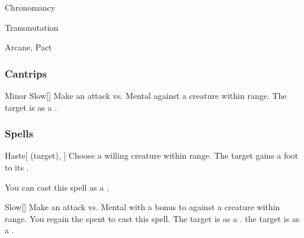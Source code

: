 \newpage
\begin{spellsection}{Chronomancy}

\begin{spellheader}
\end{spellheader}


 Transmutation

 Arcane, Pact

\subsubsection{Cantrips}


\begin{freeability}{Minor Slow}[]
Make an attack vs. Mental against a creature within \rngmed range.
\hit The target is  as a .
\end{freeability}

\end{spellsection}


\subsubsection{Spells}


\lowercase{\hypertarget{spell:Haste}{}}\label{spell:Haste}
\begin{attuneability}[\nth{1}]{\hypertarget{spell:Haste}{Haste}}[ (target), ]
Choose a willing creature within \rngmed range.
The target gains a  foot  to its .

You can cast this spell as a .
\end{attuneability}
\vspace{0.25em}



\lowercase{\hypertarget{spell:Slow}{}}\label{spell:Slow}
\begin{apability}[\nth{1}]{\hypertarget{spell:Slow}{Slow}}[]
Make an attack vs. Mental with a  bonus to  against a creature within \rngmed range.
\miss You regain the  spent to cast this spell.
\hit The target is  as a .
\crit the target is  as a .
\end{apability}
\vspace{0.25em}




